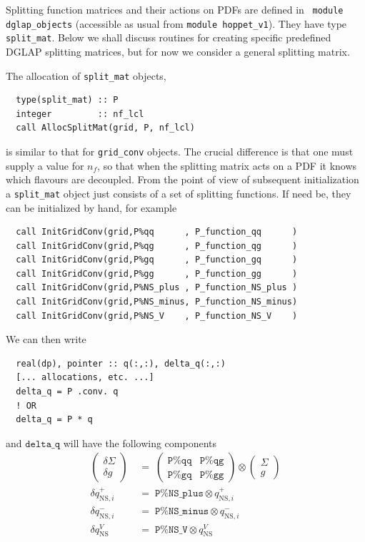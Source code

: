 \documentclass[12pt]{article}
\newcommand{\ttt}[1]{\texttt{#1}}
\begin{document}
Splitting function matrices and their actions on PDFs are defined in
   ~\ttt{module dglap\_objects} (accessible as usual from \ttt{module
  hoppet\_v1}). They have type \ttt{split\_mat}. Below we shall discuss
routines for creating specific predefined DGLAP splitting matrices,
but for now we consider a general splitting matrix.

The allocation of \ttt{split\_mat} objects,
\begin{lstlisting}
  type(split_mat) :: P
  integer         :: nf_lcl
  call AllocSplitMat(grid, P, nf_lcl)
\end{lstlisting}
is similar to that for \ttt{grid\_conv} objects. The crucial difference is
that one must supply a value for $n_f$, so that when the splitting
matrix acts on a PDF it knows which flavours are decoupled. From the
point of view of subsequent initialization a \ttt{split\_mat} object
just consists of a set of splitting functions. 
If need be, they can be
initialized by hand, for example
\begin{lstlisting}
  call InitGridConv(grid,P%qq      , P_function_qq      )
  call InitGridConv(grid,P%qg      , P_function_qg      )
  call InitGridConv(grid,P%gq      , P_function_gq      )
  call InitGridConv(grid,P%gg      , P_function_gg      )
  call InitGridConv(grid,P%NS_plus , P_function_NS_plus )
  call InitGridConv(grid,P%NS_minus, P_function_NS_minus)
  call InitGridConv(grid,P%NS_V    , P_function_NS_V    )
\end{lstlisting}
We can then write
\begin{lstlisting}
  real(dp), pointer :: q(:,:), delta_q(:,:)
  [... allocations, etc. ...]
  delta_q = P .conv. q
  ! OR
  delta_q = P * q
\end{lstlisting}
and $\ttt{delta\_q}$ will have the following components
\begin{align}
  \label{eq:Pmat_on_q}
  \left(\!\!
    \begin{array}{c}
      \delta\Sigma\\
       \delta g
    \end{array}
  \!\!\right)
    \;&= \;
  \left(
    \begin{array}{cc}
      \ttt{P\%qq} & \ttt{P\%qg}\\
      \ttt{P\%gq} & \ttt{P\%gg}
    \end{array}
  \right) 
  \otimes
  \left(\!\!
    \begin{array}{c}
      \Sigma\\
       g
    \end{array}
    \!\!\right) 
  \nonumber\\[3pt]
%
  \delta q^+_{\mathrm{NS},i} \;&=\; \ttt{P\%NS\_plus} \otimes
  q^+_{\mathrm{NS},i}\\[3pt] 
%
  \delta q^-_{\mathrm{NS},i} \;&=\; \ttt{P\%NS\_minus} \otimes
  q^-_{\mathrm{NS},i}\nonumber \\[3pt]
% 
  \delta q^V_{\mathrm{NS}} \;&=\; \ttt{P\%NS\_V} \otimes
  q^V_{\mathrm{NS}} \nonumber
\end{align}
\end{document}
